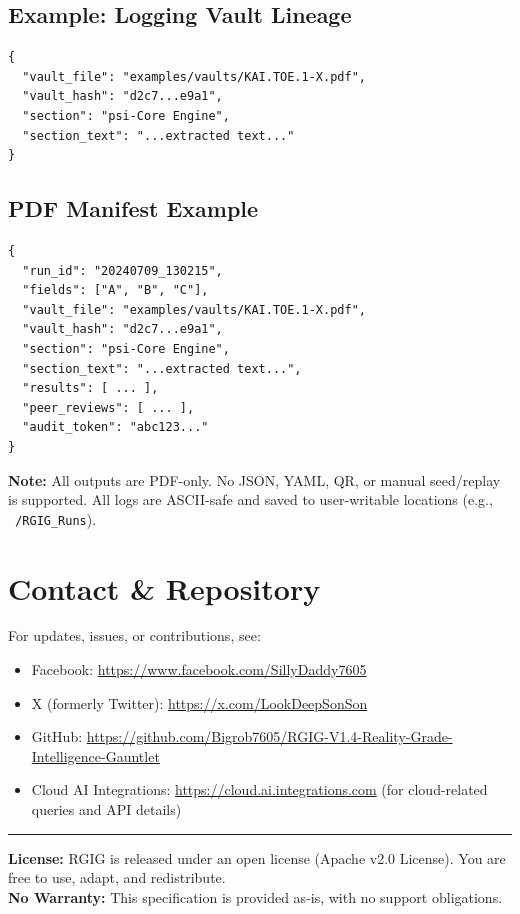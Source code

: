 \documentclass[11pt]{article}
\begin{document}
\subsection*{Example: Logging Vault Lineage}
\begin{verbatim}
{
  "vault_file": "examples/vaults/KAI.TOE.1-X.pdf",
  "vault_hash": "d2c7...e9a1",
  "section": "psi-Core Engine",
  "section_text": "...extracted text..."
}
\end{verbatim}

\subsection*{PDF Manifest Example}
\begin{verbatim}
{
  "run_id": "20240709_130215",
  "fields": ["A", "B", "C"],
  "vault_file": "examples/vaults/KAI.TOE.1-X.pdf",
  "vault_hash": "d2c7...e9a1",
  "section": "psi-Core Engine",
  "section_text": "...extracted text...",
  "results": [ ... ],
  "peer_reviews": [ ... ],
  "audit_token": "abc123..."
}
\end{verbatim}

\noindent\textbf{Note:} All outputs are PDF-only. No JSON, YAML, QR, or manual seed/replay is supported. All logs are ASCII-safe and saved to user-writable locations (e.g., \texttt{~/RGIG\_Runs}).

\section*{Contact \& Repository}
For updates, issues, or contributions, see:
\begin{itemize}
  \item Facebook: \url{https://www.facebook.com/SillyDaddy7605}
  \item X (formerly Twitter): \url{https://x.com/LookDeepSonSon}
  \item GitHub: \url{https://github.com/Bigrob7605/RGIG-V1.4-Reality-Grade-Intelligence-Gauntlet}
  \item Cloud AI Integrations: \url{https://cloud.ai.integrations.com} (for cloud-related queries and API details)
\end{itemize}

\noindent\rule{\linewidth}{0.5pt}
\noindent\textbf{License:} RGIG is released under an open license (Apache v2.0 License). You are free to use, adapt, and redistribute.\\
\noindent\textbf{No Warranty:} This specification is provided as-is, with no support obligations.
\end{document}
